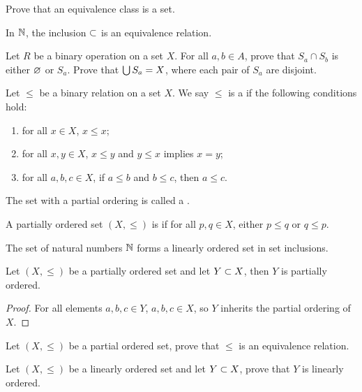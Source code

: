 \documentclass[10pt]{article}
\begin{document}
\begin{problem}
    Prove that an equivalence class is a set.
\end{problem}
\begin{example}
    In $\mathbb{N}$, the inclusion $\subset$ is an equivalence relation.
\end{example}
\begin{problem}
    Let $R$ be a binary operation on a set $X$. For all $a,b\in A$, prove that ${S}_{a}\cap{S}_{b}$ is either $\varnothing$ or ${S}_{a}$. Prove that $\bigcup{S}_{a}=X$, where each pair of ${S}_{a}$ are disjoint.
\end{problem}
\begin{definition}
    Let $\le$ be a binary relation on a set $X$. We say $\le$ is a  if the following conditions hold:
    \begin{enumerate}
        \item for all $x\in X$, $x\le x$;
        \item for all $x,y\in X$, $x\le y$ and $y\le x$ implies $x=y$;
        \item for all $a,b,c\in X$, if $a\le b$ and $b\le c$, then $a\le c$.
    \end{enumerate}
    The set with a partial ordering is called a .
\end{definition}
\begin{definition}
    A partially ordered set $(X,\le)$ is  if for all $p,q\in X$, either $p\le q$ or $q\le p$.
\end{definition}
\begin{example}
    The set of natural numbers $\mathbb{N}$ forms a linearly ordered set in set inclusions.
\end{example}
\begin{proposition}
    Let $(X,\le)$ be a partially ordered set and let $Y\subset X$, then $Y$ is partially ordered.
\end{proposition}
\begin{proof}
    For all elements $a,b,c\in Y$, $a,b,c\in X$, so $Y$ inherits the partial ordering of $X$.
\end{proof}
\begin{problem}
    Let $(X,\le)$ be a partial ordered set, prove that $\le$ is an equivalence relation.
\end{problem}
\begin{problem}
    Let $(X,\le)$ be a linearly ordered set and let $Y\subset X$, prove that $Y$ is linearly ordered.
\end{problem}
\end{document}
